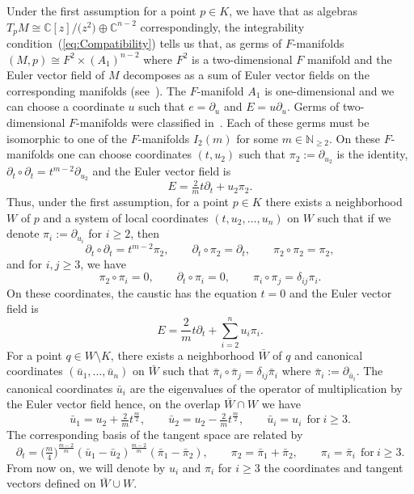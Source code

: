 \documentclass[pdftex]{sigma}
\numberwithin{equation}{section}
\begin{document}
Under the first assumption for a point $p\in K$, we have that as algebras $T_{p}M\cong \mathbb{C}[z]/\bigl(z^{2}\bigr)\oplus\mathbb{C}^{n-2}$ correspondingly, the integrability condition~(\ref{eq:Compatibility}) tells us that, as germs of $F$-manifolds $(M,p)\cong F^{2}\times (A_{1})^{n-2}$ where $F^{2}$ is a two-dimensional $F$ manifold and the Euler vector field of $M$ decomposes as a sum of Euler vector fields on the corresponding manifolds (see~\cite[Theorem~2.11]{HertlingFrobenius}). The $F$-manifold $A_{1}$ is one-dimensional and we can choose a coordinate $u$ such that $e=\partial_{u}$ and $E=u\partial_{u}$. Germs of two-dimensional $F$-manifolds were classified in~\cite[Theorem~4.7]{HertlingFrobenius}. Each of these germs must be isomorphic to one of the $F$-manifolds $I_{2}(m)$ for some $m\in\mathbb{N}_{\geq 2}$. On these $F$-manifolds one can choose coordinates $(t,u_{2})$ such that $\pi_{2}:=\partial_{u_{2}}$ is the identity, $\partial_{t}\circ\partial_{t}=t^{m-2}\partial_{u_{2}}$ and the Euler vector field is
\begin{equation*}
 E=\tfrac{2}{m}t\partial_{t}+u_{2}\pi_{2}.
\end{equation*}
\indent Thus, under the first assumption, for a point $p\in K$ there exists a neighborhood $W$ of $p$ and a system of local coordinates $(t,u_{2},\dots,u_{n})$ on $W$ such that if we denote $\pi_{i}:=\partial_{u_{i}}$ for $i\geq 2$, then
\[
 \partial_{t}\circ\partial_{t}=t^{m-2}\pi_{2},\qquad
 \partial_{t}\circ\pi_{2}=\partial_{t},\qquad
 \pi_{2}\circ\pi_{2}=\pi_{2},
\]
and for $i,j\geq3$, we have
\[
 \pi_{2}\circ\pi_{i}=0,\qquad
 \partial_{t}\circ\pi_{i}=0,\qquad
 \pi_{i}\circ\pi_{j}=\delta_{ij}\pi_{i}.
\]
 On these coordinates, the caustic has the equation $t=0$ and the Euler vector field is
 \begin{equation*}
 E=\frac{2}{m}t\partial_{t}+\sum_{i=2}^{n}u_{i}\pi_{i}.
 \end{equation*}
 For a point $q\in W\setminus K$, there exists a neighborhood $\bar{W}$ of $q$ and canonical coordinates $(\bar{u}_{1},\dots,\bar{u}_{n})$ on $\bar{W}$ such that $\bar{\pi}_{i}\circ\bar{\pi}_{j}=\delta_{ij}\bar{\pi}_{i}$ where $\bar{\pi}_{i}:=\partial_{\bar{u}_{i}}$. The canonical coordinates $\bar{u}_{i}$ are the eigenvalues of the operator of multiplication by the Euler vector field hence, on the overlap $\bar{W}\cap W$ we have%
\begin{equation}
 \label{eq:ChangeCoordinates}
 \bar{u}_{1}=u_{2}+\tfrac{2}{m}t^{\frac{m}{2}},\qquad
 \bar{u}_{2}=u_{2}-\tfrac{2}{m}t^{\frac{m}{2}},\qquad
 \bar{u}_{i}=u_{i} \ \ \mathrm{for} \ i\geq 3.
\end{equation}
The corresponding basis of the tangent space are related by
\begin{equation}
 \label{eq:ChangeBasis}
 \partial_{t}=\big( \tfrac{m}{4}\big)^{\frac{m-2}{m}}(\bar{u}_{1}-\bar{u}_{2})^{\frac{m-2}{m}}(\bar{\pi}_{1}-\bar{\pi}_{2}),\qquad
 \pi_{2}=\bar{\pi}_{1}+\bar{\pi}_{2},\qquad
 \pi_{i}=\bar{\pi}_{i} \ \ \mathrm{for}\ i\geq 3.
\end{equation}
From now on, we will denote by $u_{i}$ and $\pi_{i}$ for $i\geq 3$ the coordinates and tangent vectors defined on $\bar{W}\cup W$.
\end{document}
